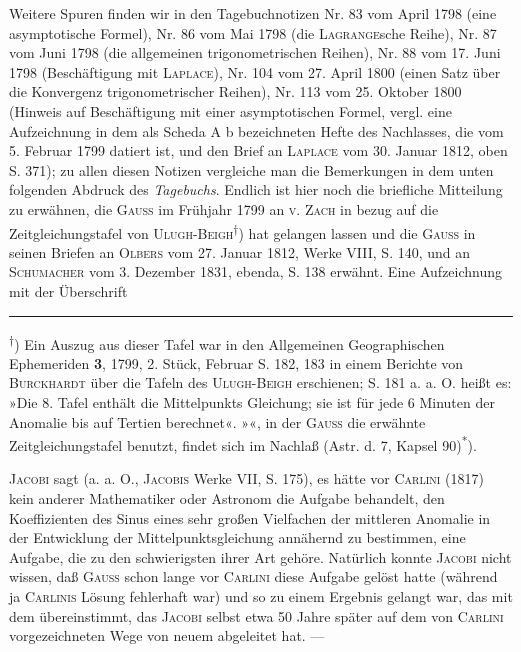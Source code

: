 \par\begingroup\small
\indent Weitere Spuren finden wir in den Tagebuchnotizen Nr. 83 vom April 1798 (eine asymptotische Formel), Nr. 86 vom Mai 1798 (die \textsc{Lagrange}sche Reihe), Nr. 87 vom Juni 1798 (die allgemeinen trigonometrischen Reihen), Nr. 88 vom 17. Juni 1798 (Beschäftigung mit \textsc{Laplace}), Nr. 104 vom 27. April 1800 (einen Satz über die Konvergenz trigonometrischer Reihen), Nr. 113 vom 25. Oktober 1800 (Hinweis auf  Beschäftigung mit einer asymptotischen Formel, vergl. eine Aufzeichnung in dem als Scheda A b bezeichneten Hefte des Nachlasses, die vom 5. Februar 1799 datiert ist, und den Brief an \textsc{Laplace} vom 30. Januar 1812, oben S. 371); zu allen diesen Notizen vergleiche man die Bemerkungen in dem unten folgenden Abdruck des \textit{Tagebuchs}. Endlich ist hier noch die briefliche Mitteilung zu erwähnen, die \textsc{Gauss} im Frühjahr 1799 an \textsc{v. Zach} in bezug auf die Zeitgleichungstafel von \textsc{Ulugh-Beigh}\textsuperscript{†}) hat gelangen lassen und die \textsc{Gauss} in seinen Briefen an \textsc{Olbers} vom 27. Januar 1812, Werke VIII, S. 140, und an \textsc{Schumacher} vom 3. Dezember 1831, ebenda, S. 138 erwähnt. Eine Aufzeichnung mit der Überschrift
\par\medskip\noindent\rule{.24\linewidth}{.4pt}\par\smallskip
\noindent\hspace*{\parindent}\textsuperscript{†}) Ein Auszug aus dieser Tafel war in den Allgemeinen Geographischen Ephemeriden \textbf{3}, 1799, 2. Stück, Februar S. 182, 183 in einem Berichte von \textsc{Burckhardt} über die Tafeln des \textsc{Ulugh-Beigh} erschienen; S. 181 a. a. O. heißt es: »Die 8. Tafel enthält die Mittelpunkts Gleichung; sie ist für jede 6 Minuten der Anomalie bis auf Tertien berechnet«.
\clearpage{}
\noindent »«, in der \textsc{Gauss} die erwähnte Zeitgleichungstafel benutzt, findet sich im Nachlaß (Astr. d. 7, Kapsel 90)\textsuperscript{*}).

\indent \textsc{Jacobi} sagt (a. a. O., \textsc{Jacobis} Werke VII, S. 175), es hätte vor \textsc{Carlini} (1817) kein anderer Mathematiker oder Astronom die Aufgabe behandelt, den Koeffizienten des Sinus eines sehr großen Vielfachen der mittleren Anomalie in der Entwicklung der Mittelpunktsgleichung annähernd zu bestimmen, eine Aufgabe, die zu den schwierigsten ihrer Art gehöre. Natürlich konnte \textsc{Jacobi} nicht wissen, daß \textsc{Gauss} schon lange vor \textsc{Carlini} diese Aufgabe  gelöst hatte (während ja \textsc{Carlinis} Lösung fehlerhaft war) und so zu einem Ergebnis gelangt war, das mit dem übereinstimmt, das \textsc{Jacobi} selbst etwa 50 Jahre später auf dem von \textsc{Carlini} vorgezeichneten Wege von neuem abgeleitet hat. —

